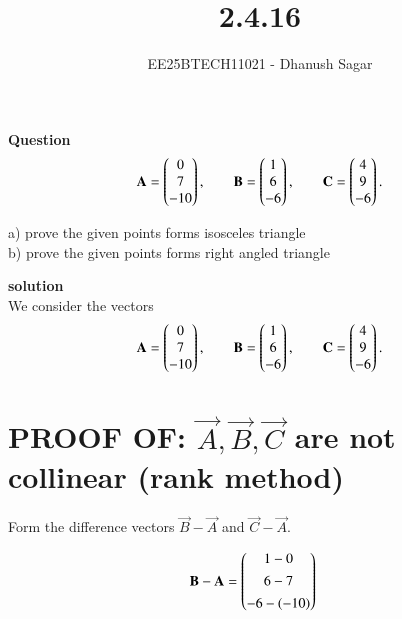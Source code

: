 \documentclass[journal]{IEEEtran}
\begin{document}



\title{2.4.16}
\author{EE25BTECH11021 - Dhanush Sagar
}
{\let\newpage\relax\maketitle}

\renewcommand{\thefigure}{\theenumi}
\renewcommand{\thetable}{\theenumi}
\setlength{\intextsep}{10pt} %


\renewcommand{\thetable}{\theenumi}


\textbf{Question}\\
\begin{align*}
\mathbf{A} = \begin{pmatrix}0\\7\\-10\end{pmatrix}, \qquad
\mathbf{B} = \begin{pmatrix}1\\6\\-6\end{pmatrix}, \qquad
\mathbf{C} = \begin{pmatrix}4\\9\\-6\end{pmatrix}.
\end{align*}

a) prove the given points forms isosceles triangle\\
b) prove the given points forms right angled triangle

\textbf{solution}\\
We consider the vectors
\begin{align*}
\mathbf{A} = \begin{pmatrix}0\\7\\-10\end{pmatrix}, \qquad
\mathbf{B} = \begin{pmatrix}1\\6\\-6\end{pmatrix}, \qquad
\mathbf{C} = \begin{pmatrix}4\\9\\-6\end{pmatrix}.
\end{align*}

\section*{ PROOF OF: $\vec{A},\vec{B},\vec{C}$ are not collinear (rank method)}
Form the difference vectors $\vec{B}-\vec{A}$ and $\vec{C}-\vec{A}$.

\begin{align}
\mathbf{B}-\mathbf{A} &= \begin{pmatrix}1-0\\[4pt]6-7\\[4pt]-6-(-10)\end{pmatrix}
\end{align}
\end{document}
